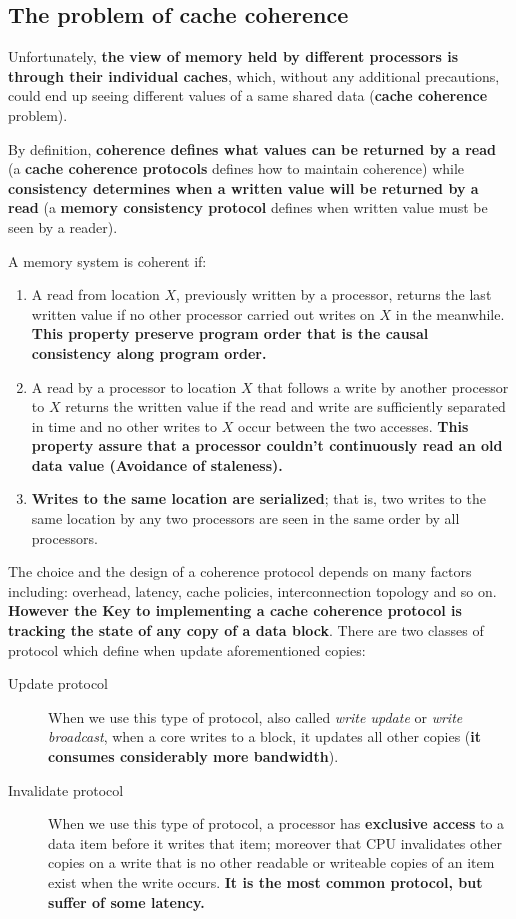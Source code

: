 \documentclass[10pt,a4paper]{article}
\begin{document}
\subsection{The problem of cache coherence}

Unfortunately, \textbf{the view of memory held by different processors is through their individual caches}, which, without any additional precautions, could end up seeing different values of a same shared data (\textbf{cache coherence} problem).

By definition, \textbf{coherence defines what values can be returned by a read} (a \textbf{cache coherence protocols} defines how to maintain coherence) while \textbf{consistency determines when a written value will be returned by a read} (a \textbf{memory consistency protocol} defines when written value must be seen by a reader).

A memory system is coherent if:
\begin{enumerate}
\item A read from location $X$, previously written by a processor, returns the last written value if no other processor carried out writes on $X$ in the meanwhile. \textbf{This property preserve program order that is the causal consistency along program order.}

\item A read by a processor to location $X$ that follows a write by another processor to $X$ returns the written value if the read and write are sufficiently separated in time and no other writes to $X$ occur between the two accesses. \textbf{This property assure that a processor couldn't continuously
read an old data value (Avoidance of staleness).}

\item \textbf{Writes to the same location are serialized}; that is, two writes to the same location by any two processors are seen in the same order by all processors.
\end{enumerate}

The choice and the design of a coherence protocol depends on many factors including: overhead, latency, cache policies, interconnection topology and so on.
\textbf{However the Key to implementing a cache coherence protocol is tracking the state of any copy of a data block}. There are two classes of protocol which define when update aforementioned copies:
\begin{description}
\item[Update protocol] When we use this type of protocol, also called \textit{write update} or \textit{write broadcast}, when a core writes to a block, it updates all other copies (\textbf{it consumes considerably more bandwidth}).

\item[Invalidate protocol] When we use this type of protocol, a processor has \textbf{exclusive access} to a data item before it writes that item; moreover that CPU invalidates other copies on a write that is no other readable or writeable copies of an item exist when the write occurs. \textbf{It is the most common protocol, but suffer of some latency.}

\end{description}
\end{document}
